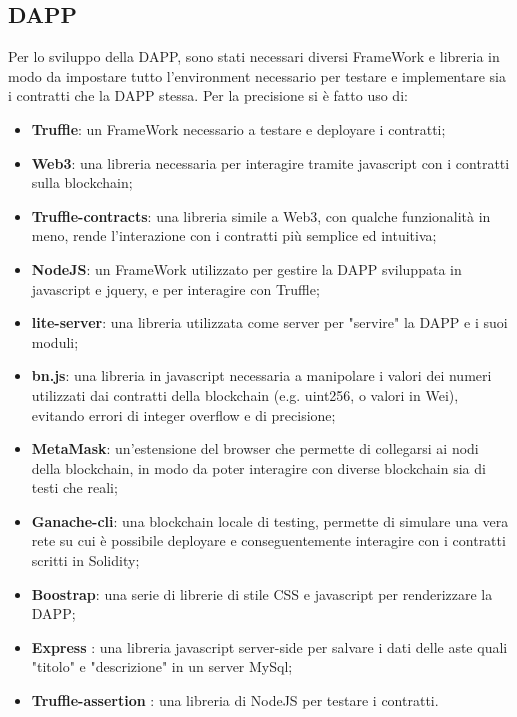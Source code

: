 \subsection{DAPP}
Per lo sviluppo della DAPP, sono stati necessari diversi FrameWork e libreria in modo da impostare tutto l'environment necessario per testare e implementare sia i contratti che la DAPP stessa. Per la precisione si è fatto uso di:\newline
\begin{itemize}
 	\item \textbf{Truffle}: un FrameWork necessario a testare e deployare i contratti;
 	\item \textbf{Web3}: una libreria necessaria per interagire tramite javascript con i contratti sulla blockchain;
 	\item \textbf{Truffle-contracts}: una libreria simile a Web3, con qualche funzionalità in meno, rende l'interazione con i contratti più semplice ed intuitiva;
 	\item \textbf{NodeJS}: un FrameWork utilizzato per gestire la DAPP sviluppata in javascript e jquery, e per interagire con Truffle;
 	\item \textbf{lite-server}: una libreria utilizzata come server per "servire" la DAPP e i suoi moduli;
 	\item \textbf{bn.js}: una libreria in javascript necessaria a manipolare i valori dei numeri utilizzati dai contratti della blockchain (e.g. uint256, o valori in Wei), evitando errori di integer overflow e di precisione;
 	\item \textbf{MetaMask}: un'estensione del browser che permette di collegarsi ai nodi della blockchain, in modo da poter interagire con diverse blockchain sia di testi che reali;
 	\item \textbf{Ganache-cli}: una blockchain locale di testing, permette di simulare una vera rete su cui è possibile deployare e conseguentemente interagire con i contratti scritti in Solidity;
 	\item \textbf{Boostrap}: una serie di librerie di stile CSS e javascript per renderizzare la DAPP;
 	\item \textbf{Express} : una libreria javascript server-side per salvare i dati delle aste quali "titolo" e "descrizione" in un server MySql;
 	\item \textbf{Truffle-assertion} : una libreria di NodeJS per testare i contratti.
\end{itemize}
